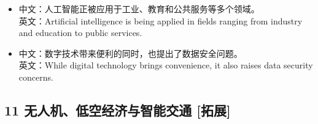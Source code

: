 \documentclass[a4paper,11pt,UTF8,fontset=none]{ctexart}
\begin{document}
\endgroup
\vspace{-2pt}

\par

\begin{itemize}[leftmargin=1.7em,itemsep=1pt,parsep=0pt,topsep=2pt]
\item \noindent 中文：人工智能正被应用于工业、教育和公共服务等多个领域。\\ 英文：Artificial intelligence is being applied in fields ranging from industry and education to public services.\par


\item \noindent 中文：数字技术带来便利的同时，也提出了数据安全问题。\\ 英文：While digital technology brings convenience, it also raises data security concerns.\par


\end{itemize}

\subsection{11 无人机、低空经济与智能交通 {\color{AccentBlue} [拓展]}}
\end{document}
